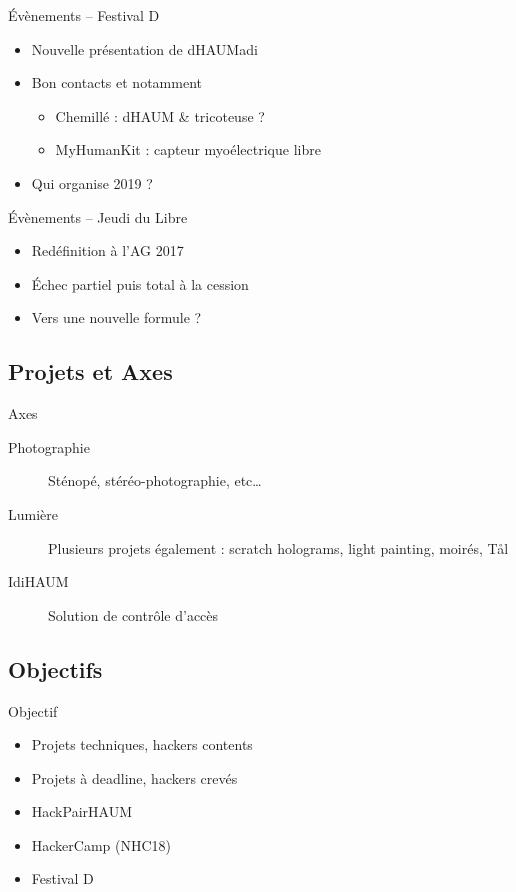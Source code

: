 \documentclass[10pt]{beamer}
\begin{document}
\begin{frame}{Évènements -- Festival D}
	\begin{itemize}
			\item Nouvelle présentation de dHAUMadi
			\item Bon contacts et notamment
				\begin{itemize}
					\item Chemillé : dHAUM \& tricoteuse ?
					\item MyHumanKit : capteur myoélectrique libre
				\end{itemize}
			\item Qui organise 2019 ?
	\end{itemize}
\end{frame}

\begin{frame}{Évènements -- Jeudi du Libre}
	\begin{itemize}
		\item Redéfinition à l'AG 2017
		\item Échec partiel puis total à la cession
		\item Vers une nouvelle formule ?
	\end{itemize}
\end{frame}

\subsection{Projets et Axes}

\begin{frame}{Axes}
	\begin{description}
		\item[Photographie] Sténopé, stéréo-photographie, etc\ldots
		\item[Lumière] Plusieurs projets également : scratch holograms, light painting,  moirés, Tål
		\item[IdiHAUM\footnotemark] Solution de contrôle d'accès
	\end{description}
\end{frame}

\subsection{Objectifs}

\begin{frame}{Objectif}
	\begin{itemize}
		\item Projets techniques, hackers contents
		\item Projets à deadline, hackers crevés
		\item HackPairHAUM
		\item HackerCamp (NHC18)
		\item Festival D
	\end{itemize}
\end{frame}
\end{document}
